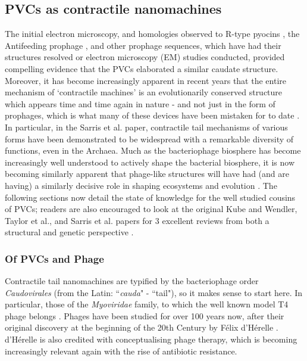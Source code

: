 \subsection{PVCs as contractile nanomachines}
The initial electron microscopy, and homologies observed to R-type pyocins \citep{Ge2015}, the Antifeeding prophage \citep{Heymann2013},  and other prophage sequences, which have had their structures resolved or electron microscopy (EM) studies conducted, provided compelling evidence that the PVCs elaborated a similar caudate structure. Moreover, it has become increasingly apparent in recent years that the entire mechanism of `contractile machines' is an evolutionarily conserved structure which appears time and time again in nature - and not just in the form of prophages, which is what many of these devices have been mistaken for to date \citep{Kube2015a, Sarris2014, Brackmann2017}. In particular, in the Sarris et al. paper, contractile tail mechanisms of various forms have been demonstrated to be widespread with a remarkable diversity of functions, even in the Archaea. Much as the bacteriophage biosphere has become increasingly well understood to actively shape the bacterial biosphere, it is now becoming similarly apparent that phage-like structures will have had (and are having) a similarly decisive role in shaping ecosystems and evolution \citep{Richard2014a}. The following sections now detail the state of knowledge for the well studied cousins of PVCs; readers are also encouraged to look at the original Kube and Wendler, Taylor et al., and Sarris et al. papers for 3 excellent reviews from both a structural and genetic perspective \citep{Kube2015a, Sarris2014, Taylor2018}.

\subsubsection{Of PVCs and Phage}
Contractile tail nanomachines are typified by the bacteriophage order \emph{Caudovirales} (from the Latin: ``\emph{cauda}" - ``tail"), so it makes sense to start here. In particular, those of the \emph{Myoviridae} family, to which the well known model T4 phage belongs \citep{Ackermann1998}. Phages have been studied for over 100 years now, after their original discovery at the beginning of the 20th Century by F\'elix d'H\'erelle \citep{DHerelle1917}. d'H\'erelle is also credited with conceptualising phage therapy, which is becoming increasingly relevant again with the rise of antibiotic resistance.

